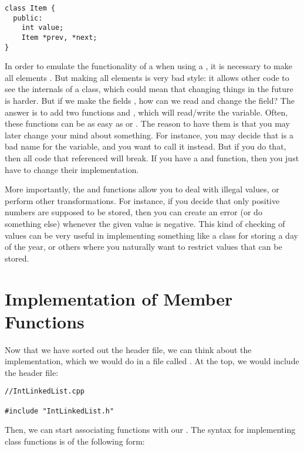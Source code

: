 \begin{verbatim}
class Item {
  public:
    int value;
    Item *prev, *next;
}
\end{verbatim}

In order to emulate the functionality of a  when using a
, it is necessary to make all elements .
But making all elements  is very bad style:
it allows other code to see the internals of a class,
which could mean that changing things in the future is harder.
But if we make the fields , how can we read and change
the  field?
The answer is to add two functions  and ,
which will read/write the  variable. 
Often, these functions can be as easy as  or 
.
The reason to have them is that you may later change your mind about
something. For instance, you may decide that  is a bad
name for the variable, and you want to call it 
instead. But if you do that, then all code that referenced 
will break. If you have a  and  function,
then you just have to change their implementation.

More importantly, the  and  functions allow you to
deal with illegal values, or perform other transformations.
For instance, if you decide that only positive numbers are supposed to be
stored, then you can create an error (or do something else) whenever
the given value is negative. This kind of checking of values can be
very useful in implementing something like a  class for
storing a day of the year,
or others where you naturally want to restrict values that can be stored.

\section{Implementation of Member Functions}

Now that we have sorted out the header file, we can think about the
implementation, which we would do in a file called
.
At the top, we would include the header file:

\begin{verbatim}
//IntLinkedList.cpp

#include "IntLinkedList.h"
\end{verbatim}

Then, we can start associating functions with our
. The syntax for implementing class functions
is of the following form:

